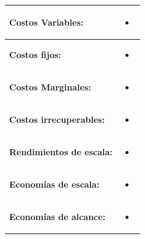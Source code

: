 \documentclass{article}
\begin{document}
\begin{center}
   \begin{longtable}{ | p{4.5cm} | p{11.5cm} | }
       \hline
            \textbf{Costos Variables: }  & 
            \begin{itemize}
                \item 
            \end{itemize} \\ 

       \hline
            \textbf{Costos fijos: } & 
            \begin{itemize}
                \item 
            \end{itemize} \\ 
            
        \hline
            \textbf{Costos Marginales: } & 
            \begin{itemize}
                \item 
            \end{itemize} \\ 
            
        \hline
            \textbf{Costos irrecuperables: } & 
            \begin{itemize}
                \item 
            \end{itemize} \\ 
        \hline
        
        \hline
            \textbf{Rendimientos de escala: } & 
            \begin{itemize}
                \item 
            \end{itemize} \\ 
        \hline
        
        \hline
            \textbf{Economías de escala: } & 
            \begin{itemize}
                \item 
            \end{itemize} \\ 
        \hline
        
        \hline
            \textbf{Economías de alcance: } & 
            \begin{itemize}
                \item 
            \end{itemize} \\ 
        \hline
        

\end{longtable}
\end{center}
\end{document}
